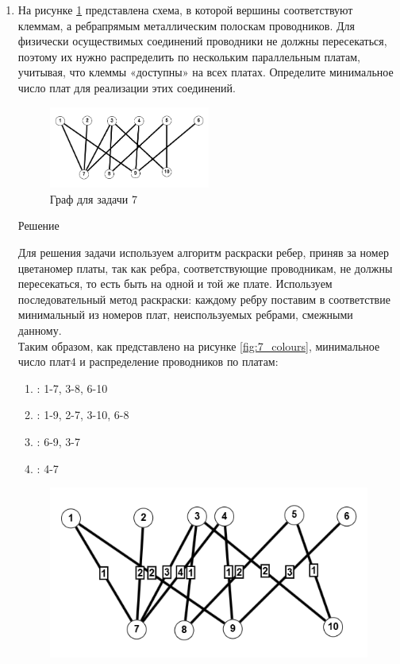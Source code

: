 \documentclass{article}
\begin{document}
\clearpage%
\begin{enumerate}
\item[\textbf{Задача 7.}] На рисунке \ref{fig:7_graph} представлена схема, в которой вершины соответствуют клеммам, а ребра\quad\textemdash\quad прямым металлическим полоскам проводников. Для физически осуществимых соединений проводники не должны пересекаться, поэтому их нужно распределить по нескольким параллельным платам, учитывая, что клеммы «доступны» на всех платах. Определите минимальное число плат для реализации этих соединений.
\begin{figure}[ht]
    \includegraphics[width=0.5\textwidth, center]{attachments/7/0.png}
    \caption{Граф для задачи 7}
    \label{fig:7_graph}
\end{figure}
\begin{center}
Решение 
\end{center}
Для решения задачи используем алгоритм раскраски ребер, приняв за номер цвета\quad\textemdash\quad номер платы, так как ребра, соответствующие проводникам, не должны пересекаться, то есть быть на одной и той же плате. Используем последовательный метод раскраски: каждому ребру поставим в соответствие минимальный из номеров плат, неиспользуемых ребрами, смежными данному.\\
Таким образом, как представлено на рисунке \ref{fig:7_colours}, минимальное число плат\quad\textemdash\quad $4$ и распределение проводников по платам:
\begin{enumerate}
            \item[\textit{1 плата}]: 1-7, 3-8, 6-10
            \item[\textit{2 плата}]: 1-9, 2-7, 3-10, 6-8
            \item[\textit{3 плата}]: 6-9, 3-7
            \item[\textit{4 плата}]: 4-7
\end{enumerate}
\begin{figure}[ht]
  \begin{minipage}[b]{.5\linewidth}
    \centering
    \includegraphics[width=\textwidth, center]{attachments/7/1.png}

\end{minipage}
\end{figure}
\end{enumerate}
\end{document}
